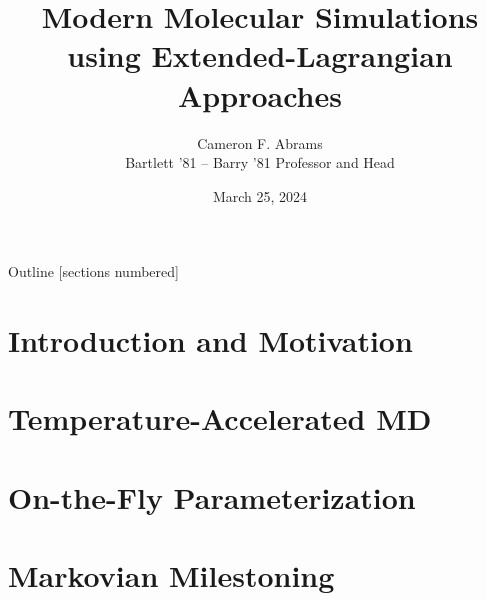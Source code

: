 \documentclass[10pt]{beamer}
\title{Modern Molecular Simulations using Extended-Lagrangian Approaches}
\date{March 25, 2024}
\author{Cameron F. Abrams\\Bartlett '81 -- Barry '81 Professor and Head}
\institute{Drexel University, Department of Chemical and Biological Engineering}
\begin{document}
\maketitle

\begin{frame}{Outline}
  [sections numbered]
  \tableofcontents[hideallsubsections]
\end{frame}

\section{Introduction and Motivation}







\section{Temperature-Accelerated MD}





\section{On-the-Fly Parameterization}



%

%










%

\section{Markovian Milestoning}





\end{document}
